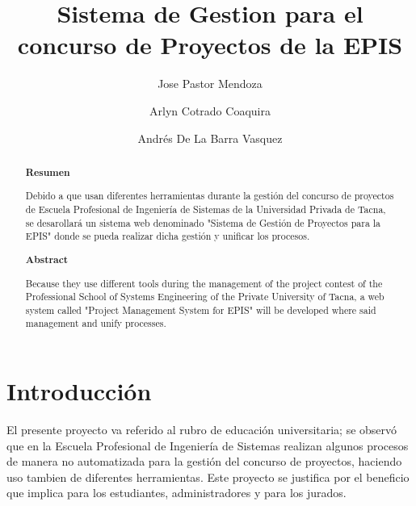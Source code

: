 \documentclass[%
 reprint,
 amsmath,amssymb,
 aps,
]{revtex4-1}
\begin{document}
\title{Sistema de Gestion para el concurso de Proyectos de la EPIS}
\author{Jose Pastor Mendoza}
\author{Arlyn Cotrado Coaquira}
\author{Andrés De La Barra Vasquez}
%

\begin{abstract}
\begin{center}
\textbf{Resumen}
\end{center}
Debido a que usan diferentes herramientas durante la gestión del concurso de proyectos de Escuela Profesional de Ingeniería de Sistemas de la Universidad Privada de Tacna, se desarollará un sistema web denominado "Sistema de Gestión de Proyectos para la EPIS" donde se pueda realizar dicha gestión y unificar los procesos.


\begin{center}
\textbf{Abstract}
\end{center}
Because they use different tools during the management of the project contest of the Professional School of Systems Engineering of the Private University of Tacna, a web system called "Project Management System for EPIS" will be developed where said management and unify processes.

\end{abstract}



\maketitle


\section {Introducción}

El presente proyecto va referido al rubro de educación universitaria; se observó que en la Escuela Profesional de Ingeniería de Sistemas realizan algunos procesos de manera no automatizada para la gestión del concurso de proyectos, haciendo uso tambien de diferentes herramientas.
Este proyecto se justifica por el beneficio que implica para los estudiantes, administradores y para los jurados.


\end{document}
